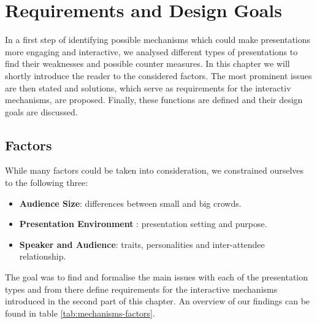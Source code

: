 \chapter{Requirements and Design Goals}
\label{cha:mechanisms}

In a first step of identifying possible mechanisms which could make presentations more engaging and interactive, we analysed different types of presentations to find their weaknesses and possible counter measures. In this chapter we will shortly introduce the reader to the considered factors. The most prominent issues are then stated and solutions, which serve as requirements for the interactiv mechanisms, are proposed. Finally, these functions are defined and their design goals are discussed.

\section{Factors}

While many factors could be taken into consideration, we constrained ourselves to the following three:
\begin{itemize}
\item\textbf{Audience Size}: differences between small and big crowds.
\item\textbf{Presentation Environment} : presentation setting and purpose.
\item\textbf{Speaker and Audience}: traits, personalities and inter-attendee relationship.
\end{itemize}
The goal was to find and formalise the main issues with each of the presentation types and from there define requirements for the interactive mechanisms introduced in the second part of this chapter. An overview of our findings can be found in table \ref{tab:mechanisms-factors}.

